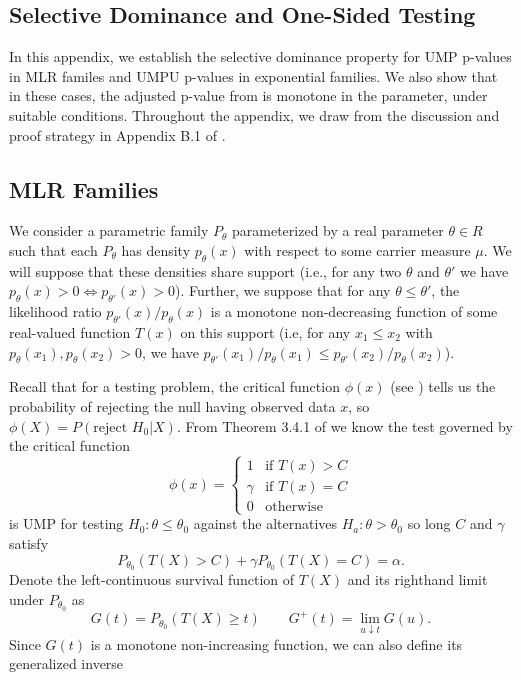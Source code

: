 \documentclass{article}
\begin{document}
\begin{appendix}
\section{Selective Dominance and One-Sided Testing}
\label{sec:one_sided_appdx}

In this appendix, we establish the selective dominance property for UMP p-values in MLR familes and UMPU p-values in exponential families. We also show that in these cases, the adjusted p-value from  is monotone in the parameter, under suitable conditions. Throughout the appendix, we draw from the discussion and proof strategy in Appendix B.1 of \cite{Lei}.

\subsection{MLR Families}
\label{sec:one_sided_mlr_appdx}

We consider a parametric family $P_{\theta}$ parameterized by a real parameter $\theta \in R$ such that each $P_{\theta}$ has density $p_{\theta}(x)$ with respect to some carrier measure $\mu$. We will suppose that these densities share support (i.e., for any two $\theta$ and $\theta'$ we have $p_{\theta}(x) > 0 \iff p_{\theta'}(x)> 0$). Further, we suppose that for any $\theta \leq \theta'$, the likelihood ratio $p_{\theta'}(x)/p_{\theta}(x)$ is a monotone non-decreasing function of some real-valued function $T(x)$ on this support (i.e, for any $x_1 \leq x_2$ with $p_{\theta}(x_1), p_{\theta}(x_2) > 0$, we have $p_{\theta'}(x_1)/p_{\theta}(x_1) \leq p_{\theta'}(x_2)/p_{\theta}(x_2)$). 

Recall that for a testing problem, the critical function $\phi(x)$ (see \cite[Section 3.1]{Lehmann}) tells us the probability of rejecting the null having observed data $x$, so $\phi(X) = P(\text{reject } H_0 | X)$. From Theorem 3.4.1 of \cite{Lehmann} we know the test governed by the critical function 
\begin{equation}
    \label{eq:mlr_test}
    \phi(x) = \begin{cases}
        1 &\text{if } T(x) > C  \\
        \gamma &\text{if } T(x) = C  \\
        0 & \text{otherwise }
    \end{cases}
\end{equation}
is UMP for testing $H_0 : \theta \leq \theta_0$ against the alternatives $H_a : \theta > \theta_0 $ so long $C$ and $\gamma$ satisfy
\begin{equation}
    \label{eq:constraint}
    P_{\theta_0}(T(X) > C) + \gamma P_{\theta_0}(T(X) = C) = \alpha.
\end{equation}
Denote the left-continuous survival function of $T(X)$ and its righthand limit under $P_{\theta_0}$ as
\begin{equation*}
    G(t) = P_{\theta_0}(T(X) \geq t) \qquad G^+(t) = \lim_{u \downarrow t} G(u).
\end{equation*}
Since $G(t)$ is a monotone non-increasing function, we can also define its generalized inverse 


\end{appendix}
\end{document}
